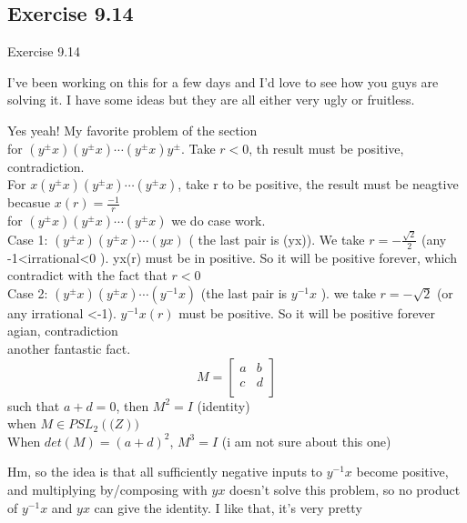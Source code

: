 \documentclass[15pt]{scrartcl}
\begin{document}
\subsection{Exercise 9.14}
\begin{discussion*}Exercise 9.14
    \begin{evie*}
        I've been working on this for a few days and I'd love to see how you guys are solving it. I have some ideas but they are all either very ugly or fruitless.
    \end{evie*}
    \begin{abboy*}
        Yes yeah!
    My favorite problem of the section
    \\
    for $(y^{\pm}x)(y^{\pm}x) \cdots (y^{\pm}x)y^{\pm}$. Take $r<0$, th result must be positive, contradiction.
    \\
    For $x(y^{\pm}x)(y^{\pm}x) \cdots (y^{\pm}x)$, take r to be positive, the result must be neagtive
    \\
    becasue $x(r)=\frac{-1}{r}$
    \\
    for $(y^{\pm}x)(y^{\pm}x) \cdots (y^{\pm}x)$ we do case work.
    \\
    Case 1: $(y^{\pm}x)(y^{\pm}x) \cdots (yx)$ ( the last pair is (yx)). We take $r= -\frac{\sqrt{2}}{2} $ (any -1<irrational<0 ). yx(r) must be in positive. So it will be positive forever, which contradict with the fact that $r<0$
    \\
    Case 2: $(y^{\pm}x)(y^{\pm}x) \cdots (y^{-1}x)$ (the last pair is $y^{-1}x$ ). we take $r=-\sqrt{2}$ (or any irrational <-1). $y^{-1}x(r) $ must be positive. So it will be positive forever
    \\
    agian, contradiction
    \\
    another fantastic fact.  
    \[ M= \left[ 
        {\begin{array}{cc}
        a & b\\
        c & d \\
        \end{array} } \right]
    \] 
    such that $a+d=0$, then $M^2=I$ (identity)
    \\
    when $M\in PSL_2(\mathbb(Z))$ 
    \\
    When $det(M)=(a+d)^2$, $M^3=I$ (i am not sure about this one)
    \end{abboy*}
    \begin{evie*}
        Hm, so the idea is that all sufficiently negative inputs to $y^{-1}x$ become positive, and multiplying by/composing with $yx$ doesn't solve this problem, so no product of $y^{-1}x$ and $yx$ can give the identity. I like that, it's very pretty

\end{evie*}
\end{discussion*}
\end{document}
